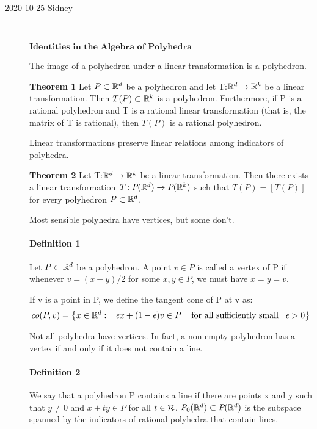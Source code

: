 \begin{description}
\item[2020-10-25 Sidney]~

$\textbf{Identities in the Algebra of Polyhedra}$

The image of a polyhedron under a linear transformation is a polyhedron.

\textbf{Theorem 1} Let $P\subset\mathbb{R}^d$ be a polyhedron and let T:$\mathbb{R}^d\rightarrow\mathbb{R}^k$ be a linear transformation. Then $T(P)\subset\mathbb{R}^k$ is a polyhedron. Furthermore, if P is a rational polyhedron and T is a rational linear transformation (that is, the matrix of T is rational), then $T(P)$ is a rational polyhedron.

Linear transformations preserve linear relations among indicators of polyhedra.

\textbf{Theorem 2}
Let T:$\mathbb{R}^d\rightarrow\mathbb{R}^k$ be a linear transformation. Then
there exists a linear transformation
$\textit{T}:\textit{P}(\mathbb{R}^d)\rightarrow\textit{P}(\mathbb{R}^k)$ such
that $\textit{T}(P)=[T(P)]$ for every polyhedron $P\subset\mathbb{R}^d$.

Most sensible polyhedra have vertices, but some don't.

\paragraph{Definition  1} Let $P\subset\mathbb{R}^d$ be a polyhedron.
A point $v\in P$ is called a vertex of P if whenever $v=(x+y)/2$ for some
$x,y\in P$, we must have $x=y=v$.

If v is a point in P, we define the tangent cone of P at v as:
$$co(P,v)=\left\lbrace x\in\mathbb{R}^d:
   \hspace{3mm} \epsilon x+(1-\epsilon)v\in P \hspace{3mm}\mbox{ for all sufficiently small} \hspace{3mm}\epsilon>0\right\rbrace$$

Not all polyhedra have vertices. In fact, a non-empty polyhedron has a vertex if and only if it does not contain a line.

\paragraph{Definition  2}
We say that a polyhedron P contains a line if there are points x and y
such that $y\neq 0$ and $x+ty\in P$ for all $t\in\mathcal{R}$.
$\textit{P}_0(\mathbb{R}^d)\subset\textit{P}(\mathbb{R}^d)$ is the subspace
spanned by the indicators of rational polyhedra that contain lines.


\end{description}
